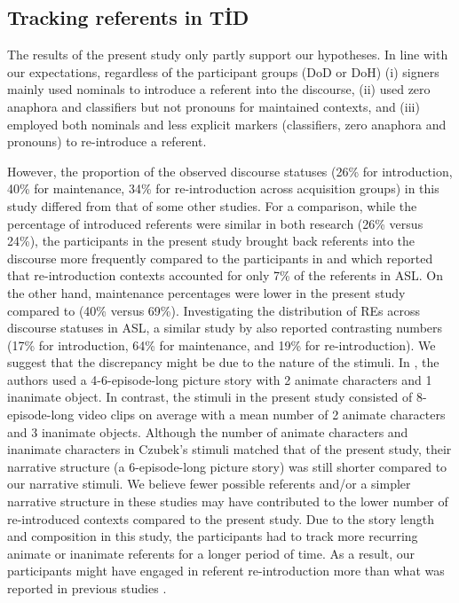 \documentclass[review]{elsarticle} %
\begin{document}
\hypertarget{tracking-referents-in-tid}{%
\subsection{Tracking referents in TİD}\label{tracking-referents-in-tid}}

The results of the present study only partly support our hypotheses. In
line with our expectations, regardless of the participant groups (DoD or
DoH) (i) signers mainly used nominals to introduce a referent into the
discourse, (ii) used zero anaphora and classifiers but not pronouns for
maintained contexts, and (iii) employed both nominals and less explicit
markers (classifiers, zero anaphora and pronouns) to re-introduce a
referent.

However, the proportion of the observed discourse statuses (26\% for
introduction, 40\% for maintenance, 34\% for re-introduction across
acquisition groups) in this study differed from that of some other
studies. For a comparison, while the percentage of introduced referents
were similar in both research (26\% versus 24\%), the participants in
the present study brought back referents into the discourse more
frequently compared to the participants in \citet{frederiksen2019} and
\citet{frederiksen2016} which reported that re-introduction contexts
accounted for only 7\% of the referents in ASL. On the other hand,
maintenance percentages were lower in the present study compared to
\citet{frederiksen2016} (40\% versus 69\%). Investigating the
distribution of REs across discourse statuses in ASL, a similar study by
\citet{czubek2017} also reported contrasting numbers (17\% for
introduction, 64\% for maintenance, and 19\% for re-introduction). We
suggest that the discrepancy might be due to the nature of the stimuli.
In \citet{frederiksen2016}, the authors used a 4-6-episode-long picture
story with 2 animate characters and 1 inanimate object. In contrast, the
stimuli in the present study consisted of 8-episode-long video clips on
average with a mean number of 2 animate characters and 3 inanimate
objects. Although the number of animate characters and inanimate
characters in Czubek's \citeyearpar{czubek2017} stimuli matched that of
the present study, their narrative structure (a 6-episode-long picture
story) was still shorter compared to our narrative stimuli. We believe
fewer possible referents and/or a simpler narrative structure in these
studies may have contributed to the lower number of re-introduced
contexts compared to the present study. Due to the story length and
composition in this study, the participants had to track more recurring
animate or inanimate referents for a longer period of time. As a result,
our participants might have engaged in referent re-introduction more
than what was reported in previous studies
\citep{czubek2017, frederiksen2016}.
\end{document}
